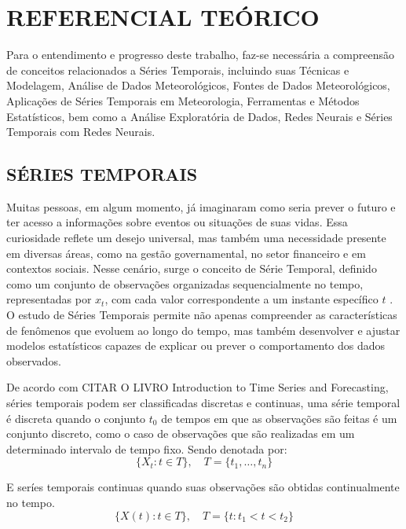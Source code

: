 \chapter{REFERENCIAL TEÓRICO}
Para o entendimento e progresso deste trabalho, faz-se necessária a compreensão de conceitos relacionados a Séries Temporais, incluindo suas Técnicas e Modelagem, Análise de Dados Meteorológicos, Fontes de Dados Meteorológicos, Aplicações de Séries Temporais em Meteorologia, Ferramentas e Métodos Estatísticos, bem como a Análise Exploratória de Dados, Redes Neurais e Séries Temporais com Redes Neurais. 

\section{SÉRIES TEMPORAIS}
    Muitas pessoas, em algum momento, já imaginaram como seria prever o futuro e ter acesso a informações sobre eventos 
    ou situações de suas vidas. Essa curiosidade reflete um desejo universal, mas também uma necessidade presente em 
    diversas áreas, como na gestão governamental, no setor financeiro e em contextos sociais. Nesse cenário, surge o 
    conceito de Série Temporal, definido como um conjunto de observações organizadas sequencialmente no tempo, 
    representadas por \( x_t \), com cada valor correspondente a um instante específico \(t\) \cite{box2015}. O estudo de 
    Séries Temporais permite não apenas compreender as características de fenômenos que evoluem ao longo do tempo, mas 
    também desenvolver e ajustar modelos estatísticos capazes de explicar ou prever o comportamento dos dados 
    observados.
    
    De acordo com CITAR O LIVRO Introduction to Time Series and Forecasting, séries temporais podem ser classificadas 
    discretas e continuas, uma série temporal é discreta quando o conjunto \( t_0 \) de tempos em que as observações 
    são feitas é um conjunto discreto, como o caso de observações que são realizadas em um determinado intervalo de 
    tempo fixo. Sendo denotada por:
    \begin{equation}
        \{X_t : t \in T\}, \quad T = \{t_1, \dots, t_n\}
    \end{equation}
    
    
    
    E seríes temporais continuas quando suas observações são obtidas continualmente 
    no tempo. 
    \begin{equation}
        \{X(t) : t \in T\}, \quad T = \{t : t_1 < t < t_2\}
    \end{equation}
        

